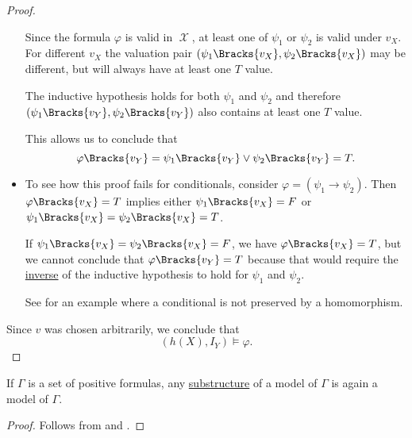 \begin{proof}
\begin{itemize}
    Since the formula \( \varphi \) is valid in \( \mscrX \), at least one of \( \psi_1 \) or \( \psi_2 \) is valid under \( v_X \). For different \( v_X \) the valuation pair \( (\psi_1\Bracks{v_X}, \psi_2\Bracks{v_X}) \) may be different, but will always have at least one \( T \) value.

    The inductive hypothesis holds for both \( \psi_1 \) and \( \psi_2 \) and therefore \( (\psi_1\Bracks{v_Y}, \psi_2\Bracks{v_Y}) \) also contains at least one \( T \) value.

    This allows us to conclude that
    \begin{equation*}
      \varphi\Bracks{v_Y}
      =
      \psi_1\Bracks{v_Y} \vee \psi_2\Bracks{v_Y}
      =
      T.
    \end{equation*}

    \item To see how this proof fails for conditionals, consider \( \varphi = (\psi_1 \rightarrow \psi_2) \). Then \( \varphi\Bracks{v_X} = T \) implies either \( \psi_1\Bracks{v_X} = F \) or \( \psi_1\Bracks{v_X} = \psi_2\Bracks{v_X} = T \).

    If \( \psi_1\Bracks{v_X} = \psi_2\Bracks{v_X} = F \), we have \( \varphi\Bracks{v_X} = T \), but we cannot conclude that \( \varphi\Bracks{v_Y} = T \) because that would require the \hyperref[def:material_implication/inverse]{inverse} of the inductive hypothesis to hold for \( \psi_1 \) and \( \psi_2 \).

    See  for an example where a conditional is not preserved by a homomorphism.
  \end{itemize}

  Since \( v \) was chosen arbitrarily, we conclude that
  \begin{equation*}
    (h(X), I_Y) \vDash \varphi.
  \end{equation*}
\end{proof}

\begin{corollary}\label{thm:substructure_is_model}
  If \( \Gamma \) is a set of positive formulas, any \hyperref[def:first_order_substructure]{substructure} of a model of \( \Gamma \) is again a model of \( \Gamma \).
\end{corollary}
\begin{proof}
  Follows from  and .
\end{proof}

